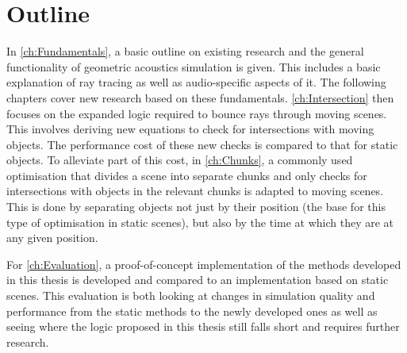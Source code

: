 \section{Outline}

In \autoref{ch:Fundamentals}, a basic outline on existing research and the general functionality of geometric acoustics simulation is given.
This includes a basic explanation of ray tracing as well as audio-specific aspects of it.
The following chapters cover new research based on these fundamentals.
\newline
\autoref{ch:Intersection} then focuses on the expanded logic required to bounce rays through moving scenes.
This involves deriving new equations to check for intersections with moving objects.
The performance cost of these new checks is compared to that for static objects.
\newline
To alleviate part of this cost, in \autoref{ch:Chunks},
a commonly used optimisation that divides a scene into separate chunks
and only checks for intersections with objects in the relevant chunks is adapted to moving scenes.
This is done by separating objects not just by their position (the base for this type of optimisation in static scenes),
but also by the time at which they are at any given position.
\iffalse
    \newline
    irs ch5
\fi
\newline
For \autoref{ch:Evaluation}, a proof-of-concept implementation of the methods developed in this thesis is developed
and compared to an implementation based on static scenes.
This evaluation is both looking at changes in simulation quality and performance from the static methods to the newly developed ones
as well as seeing where the logic proposed in this thesis still falls short and requires further research.